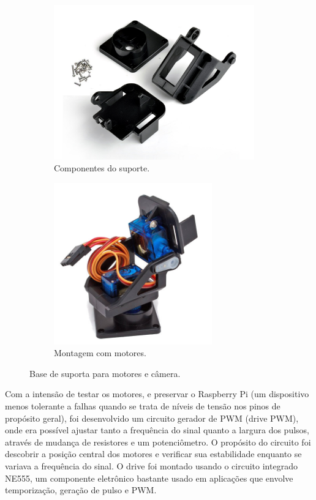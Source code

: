 \begin{figure}[H]
	\centering
	\begin{subfigure}{.5\textwidth}
		\includegraphics[width=0.95\textwidth]{figuras/base2.jpg}
		\caption{Componentes do suporte.}
		\label{fig:basedesmontada}
	\end{subfigure}%
	\begin{subfigure}{.5\textwidth}
		\includegraphics[width=0.75\textwidth]{figuras/base3.jpg}
		\caption{Montagem com motores.}
		\label{fig:basemontada}
	\end{subfigure}
	\caption{Base de suporta para motores e câmera.}
\end{figure}

Com a intensão de testar os motores, e preservar o Raspberry Pi (um dispositivo menos tolerante a falhas quando se trata de níveis de tensão nos pinos de propósito geral), foi desenvolvido um circuito gerador de PWM (drive PWM), onde era possível ajustar tanto a frequência do sinal quanto a largura dos pulsos, através de mudança de resistores e um potenciômetro. O propósito do circuito foi descobrir a posição central dos motores e verificar sua estabilidade enquanto se variava a frequência do sinal. O drive foi montado usando o circuito integrado NE555, um componente eletrônico bastante usado em aplicações que envolve temporização, geração de pulso e PWM. \par

